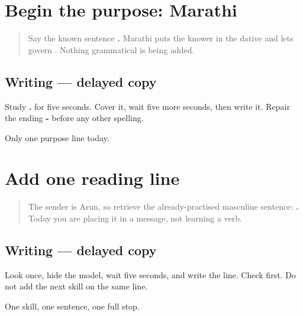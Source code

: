 \section[malā marāṭhī yete]{Begin the purpose: Marathi}

\label{lesson:MR-A1M04-language-line}



\begin{quote}
Say the known sentence \textbf{  .} Marathi puts the knower in the dative and lets \textbf{} govern \textbf{}. Nothing grammatical is being added.
\end{quote}

\subsection*{Writing — delayed copy}
Study \textbf{  .} for five seconds. Cover it, wait five more seconds, then write it. Repair the ending \textbf{-} before any other spelling.

\begin{tcolorbox}[breakable,colback=teal!4,colframe=teal!35!black,title={Before you move on}]
Only one purpose line today.
\end{tcolorbox}
\section[mī marāṭhī vāchto]{Add one reading line}

\label{lesson:MR-A1M05-reading-line}



\begin{quote}
The sender is Arun, so retrieve the already-practised masculine sentence: \textbf{  .} Today you are placing it in a message, not learning a verb.
\end{quote}

\subsection*{Writing — delayed copy}
Look once, hide the model, wait five seconds, and write the line. Check \textbf{} first. Do not add the next skill on the same line.

\begin{tcolorbox}[breakable,colback=teal!4,colframe=teal!35!black,title={Before you move on}]
One skill, one sentence, one full stop.
\end{tcolorbox}
